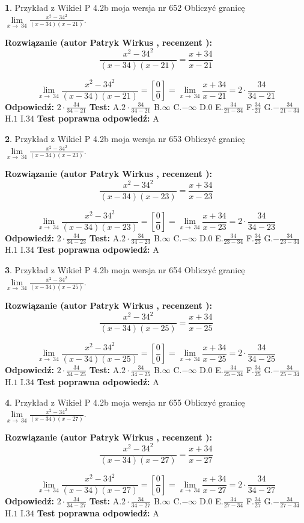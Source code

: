 \documentclass[12pt, a4paper]{article}
\theoremstyle{definition} %
\newtheorem{zad}{}
\newcommand{\zadStart}[1]{\begin{zad}#1\newline}
\newcommand{\zadStop}{\end{zad}}
\newcommand{\rozwStart}[2]{\noindent \textbf{Rozwiązanie (autor #1 , recenzent #2): }\newline}
\newcommand{\rozwStop}{\newline}
\newcommand{\odpStart}{\noindent \textbf{Odpowiedź:}\newline}
\newcommand{\odpStop}{\newline}
\newcommand{\testStart}{\noindent \textbf{Test:}\newline}
\newcommand{\testStop}{\newline}
\newcommand{\kluczStart}{\noindent \textbf{Test poprawna odpowiedź:}\newline}
\newcommand{\kluczStop}{\newline}
\begin{document}
\zadStart{Przykład z Wikieł P 4.2b moja wersja nr 652}
Obliczyć granicę $\lim\limits_{x\to\ 34}\frac{x^{2}-34^{2}}{(x-34)(x-21)}$.
\zadStop
\rozwStart{Patryk Wirkus}{}
$$\frac{x^{2}-34^{2}}{(x-34)(x-21)}=\frac{x+34}{x-21}$$

$$\lim\limits_{x\to\ 34}\frac{x^{2}-34^{2}}{(x-34)(x-21)}=[\frac{0}{0}]=\lim\limits_{x\to\ 34}\frac{x+34}{x-21}=2 \cdot \frac{34}{34-21}$$
\rozwStop
\odpStart
$2 \cdot \frac{34}{34-21}$
\odpStop
\testStart
A.$2 \cdot \frac{34}{34-21}$
B.$\infty$
C.$-\infty$
D.$0$
E.$\frac{34}{21-34}$
F.$\frac{34}{21}$
G.$-\frac{34}{21-34}$
H.$1$
I.$34$
\testStop
\kluczStart
A
\kluczStop



\zadStart{Przykład z Wikieł P 4.2b moja wersja nr 653}
Obliczyć granicę $\lim\limits_{x\to\ 34}\frac{x^{2}-34^{2}}{(x-34)(x-23)}$.
\zadStop
\rozwStart{Patryk Wirkus}{}
$$\frac{x^{2}-34^{2}}{(x-34)(x-23)}=\frac{x+34}{x-23}$$

$$\lim\limits_{x\to\ 34}\frac{x^{2}-34^{2}}{(x-34)(x-23)}=[\frac{0}{0}]=\lim\limits_{x\to\ 34}\frac{x+34}{x-23}=2 \cdot \frac{34}{34-23}$$
\rozwStop
\odpStart
$2 \cdot \frac{34}{34-23}$
\odpStop
\testStart
A.$2 \cdot \frac{34}{34-23}$
B.$\infty$
C.$-\infty$
D.$0$
E.$\frac{34}{23-34}$
F.$\frac{34}{23}$
G.$-\frac{34}{23-34}$
H.$1$
I.$34$
\testStop
\kluczStart
A
\kluczStop



\zadStart{Przykład z Wikieł P 4.2b moja wersja nr 654}
Obliczyć granicę $\lim\limits_{x\to\ 34}\frac{x^{2}-34^{2}}{(x-34)(x-25)}$.
\zadStop
\rozwStart{Patryk Wirkus}{}
$$\frac{x^{2}-34^{2}}{(x-34)(x-25)}=\frac{x+34}{x-25}$$

$$\lim\limits_{x\to\ 34}\frac{x^{2}-34^{2}}{(x-34)(x-25)}=[\frac{0}{0}]=\lim\limits_{x\to\ 34}\frac{x+34}{x-25}=2 \cdot \frac{34}{34-25}$$
\rozwStop
\odpStart
$2 \cdot \frac{34}{34-25}$
\odpStop
\testStart
A.$2 \cdot \frac{34}{34-25}$
B.$\infty$
C.$-\infty$
D.$0$
E.$\frac{34}{25-34}$
F.$\frac{34}{25}$
G.$-\frac{34}{25-34}$
H.$1$
I.$34$
\testStop
\kluczStart
A
\kluczStop



\zadStart{Przykład z Wikieł P 4.2b moja wersja nr 655}
Obliczyć granicę $\lim\limits_{x\to\ 34}\frac{x^{2}-34^{2}}{(x-34)(x-27)}$.
\zadStop
\rozwStart{Patryk Wirkus}{}
$$\frac{x^{2}-34^{2}}{(x-34)(x-27)}=\frac{x+34}{x-27}$$

$$\lim\limits_{x\to\ 34}\frac{x^{2}-34^{2}}{(x-34)(x-27)}=[\frac{0}{0}]=\lim\limits_{x\to\ 34}\frac{x+34}{x-27}=2 \cdot \frac{34}{34-27}$$
\rozwStop
\odpStart
$2 \cdot \frac{34}{34-27}$
\odpStop
\testStart
A.$2 \cdot \frac{34}{34-27}$
B.$\infty$
C.$-\infty$
D.$0$
E.$\frac{34}{27-34}$
F.$\frac{34}{27}$
G.$-\frac{34}{27-34}$
H.$1$
I.$34$
\testStop
\kluczStart
A
\kluczStop
\end{document}
